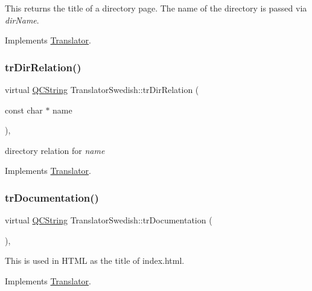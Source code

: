 This returns the title of a directory page. The name of the directory is passed via {\itshape dir\+Name}. 

Implements \mbox{\hyperlink{class_translator}{Translator}}.

\mbox{\label{class_translator_swedish_ae13fe80fbee2ae648049076e42a12039}} 
\subsubsection{\texorpdfstring{trDirRelation()}{trDirRelation()}}
{\footnotesize\ttfamily virtual \mbox{\hyperlink{class_q_c_string}{Q\+C\+String}} Translator\+Swedish\+::tr\+Dir\+Relation (\begin{DoxyParamCaption}\item[{const char $\ast$}]{name }\end{DoxyParamCaption})\hspace{0.3cm}{\ttfamily [inline]}, {\ttfamily [virtual]}}

directory relation for {\itshape name} 

Implements \mbox{\hyperlink{class_translator}{Translator}}.

\mbox{\label{class_translator_swedish_a8b5a6cca08d9370cc01a98133843b267}} 
\subsubsection{\texorpdfstring{trDocumentation()}{trDocumentation()}}
{\footnotesize\ttfamily virtual \mbox{\hyperlink{class_q_c_string}{Q\+C\+String}} Translator\+Swedish\+::tr\+Documentation (\begin{DoxyParamCaption}{ }\end{DoxyParamCaption})\hspace{0.3cm}{\ttfamily [inline]}, {\ttfamily [virtual]}}

This is used in H\+T\+ML as the title of index.\+html. 

Implements \mbox{\hyperlink{class_translator}{Translator}}.

\mbox{\label{class_translator_swedish_adaa0f57a83ee593fac6ddf9d06590cc1}} 
